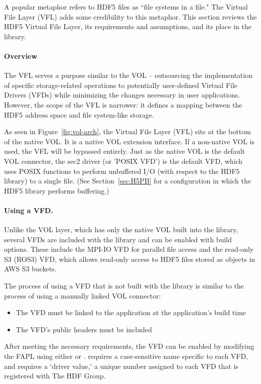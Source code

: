 A popular metaphor refers to HDF5 files as ``file systems in a file." The Virtual File Layer (VFL) adds some credibility to this metaphor. This section reviews the HDF5 Virtual File Layer, its requirements and assumptions, and its place in the library.

\paragraph{Overview} The VFL serves a purpose similar to the VOL -- outsourcing the implementation of specific storage-related operations to potentially user-defined Virtual File Drivers (VFDs) while minimizing the changes necessary in user applications. However, the scope of the VFL is narrower: it defines a mapping between the HDF5 address space and file system-like storage.

As seen in Figure~\ref{fig:vol-arch}, the Virtual File Layer (VFL) sits at the bottom of the native VOL. It is a native VOL extension interface. If a non-native VOL is used, the VFL will be bypassed entirely. Just as the native VOL is the default VOL connector, the sec2 driver (or 'POSIX VFD') is the default VFD, which uses POSIX functions to perform unbuffered I/O (with respect to the HDF5 library) to a single file. (See Section~\ref{sec:H5PB} for a configuration in which the HDF5 library performs buffering.)

\paragraph{Using a VFD.} Unlike the VOL layer, which has only the native VOL built into the library, several VFDs are included with the library and can be enabled with build options. These include the MPI-IO VFD for parallel file access and the read-only S3 (ROS3) VFD, which allows read-only access to HDF5 files stored as objects in AWS S3 buckets.

The process of using a VFD that is not built with the library is similar to the process of using a manually linked VOL connector:
\begin{itemize}
    \item The VFD must be linked to the application at the application's build time
    \item The VFD's public headers must be included
\end{itemize}

After meeting the necessary requirements, the VFD can be enabled by modifying the FAPL using either  or .  requires a case-sensitive name specific to each VFD, and  requires a `driver value,' a unique number assigned to each VFD that is registered with The HDF Group.


